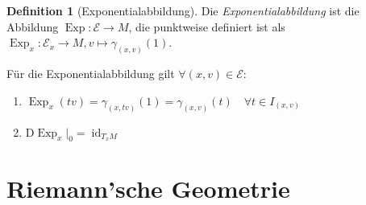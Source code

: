 \documentclass[a4paper]{scrreprt}
\numberwithin{equation}{chapter}
\newcommand{\DD}{\mathrm{D}}
\DeclareMathOperator{\id}{id}
\DeclareMathOperator{\Exp}{Exp}
\theoremstyle{definition}
\newtheorem{defn}{Definition}[section]
\begin{document}
		\begin{defn}[Exponentialabbildung]
			Die \emph{Exponentialabbildung} ist die Abbildung $\Exp\colon \mathcal{E}\rightarrow M$, die punktweise definiert ist als $\Exp_x\colon \mathcal{E}_x\rightarrow M, v\mapsto \gamma_{(x,v)}(1)$.
			
			Für die Exponentialabbildung gilt $\forall(x,v)\in \mathcal{E}$:
			\begin{enumerate}[label=\arabic* .]
				\item $\Exp_x(tv)=\gamma_{(x,tv)}(1)=\gamma_{(x,v)}(t) \quad\forall t\in I_{(x,v)}$
				\item $\DD\Exp_x\vert_0=\id_{T_xM}$
			\end{enumerate}
		\end{defn}
		
		

\chapter{Riemann'sche Geometrie}
\end{document}

